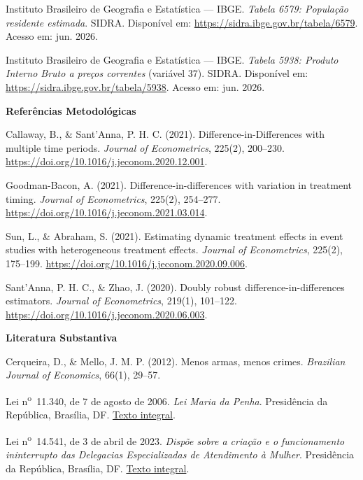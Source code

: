 \documentclass[twocolumn, 10pt]{article}
\begin{document}
Instituto Brasileiro de Geografia e Estatística — IBGE. \textit{Tabela 6579:
População residente estimada}. SIDRA. Disponível em:
\href{https://sidra.ibge.gov.br/tabela/6579}{https://sidra.ibge.gov.br/tabela/6579}.
Acesso em: jun. 2026.

Instituto Brasileiro de Geografia e Estatística — IBGE. \textit{Tabela 5938:
Produto Interno Bruto a preços correntes} (variável 37). SIDRA. Disponível em:
\href{https://sidra.ibge.gov.br/tabela/5938}{https://sidra.ibge.gov.br/tabela/5938}.
Acesso em: jun. 2026.

\smallskip
\textbf{Referências Metodológicas}

Callaway, B., \& Sant'Anna, P. H. C. (2021). Difference-in-Differences with
multiple time periods. \textit{Journal of Econometrics}, 225(2), 200--230.
\href{https://doi.org/10.1016/j.jeconom.2020.12.001}{https://doi.org/10.1016/j.jeconom.2020.12.001}.

Goodman-Bacon, A. (2021). Difference-in-differences with variation in
treatment timing. \textit{Journal of Econometrics}, 225(2), 254--277.
\href{https://doi.org/10.1016/j.jeconom.2021.03.014}{https://doi.org/10.1016/j.jeconom.2021.03.014}.

Sun, L., \& Abraham, S. (2021). Estimating dynamic treatment effects in
event studies with heterogeneous treatment effects. \textit{Journal of
Econometrics}, 225(2), 175--199.
\href{https://doi.org/10.1016/j.jeconom.2020.09.006}{https://doi.org/10.1016/j.jeconom.2020.09.006}.

Sant'Anna, P. H. C., \& Zhao, J. (2020). Doubly robust difference-in-differences
estimators. \textit{Journal of Econometrics}, 219(1), 101--122.
\href{https://doi.org/10.1016/j.jeconom.2020.06.003}{https://doi.org/10.1016/j.jeconom.2020.06.003}.

\smallskip
\textbf{Literatura Substantiva}

Cerqueira, D., \& Mello, J. M. P. (2012). Menos armas, menos crimes.
\textit{Brazilian Journal of Economics}, 66(1), 29--57.

Lei n\textsuperscript{o}~11.340, de 7 de agosto de 2006. \textit{Lei Maria
da Penha}. Presidência da República, Brasília, DF.
\href{https://www.planalto.gov.br/ccivil_03/_ato2004-2006/2006/lei/l11340.htm}{Texto integral}.

Lei n\textsuperscript{o}~14.541, de 3 de abril de 2023. \textit{Dispõe sobre a
criação e o funcionamento ininterrupto das Delegacias Especializadas de
Atendimento à Mulher}. Presidência da República, Brasília, DF.
\href{https://www.planalto.gov.br/ccivil_03/_ato2023-2026/2023/lei/l14541.htm}{Texto integral}.
\end{document}
